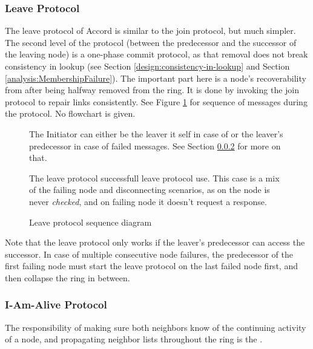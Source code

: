 \subsubsection{Leave Protocol}

The leave protocol of Accord is similar to the join protocol, but much simpler. The
 second level of the protocol (between the predecessor and the successor of the
 leaving node) is a one-phase commit protocol, as that removal does not break consistency in
 lookup (see Section \ref{design:consistency-in-lookup} and Section \ref{analysis:MembershipFailure}).
 The important part here is a node's
 recoverability from after being halfway removed from the ring. It is done by invoking
 the join protocol to repair links consistently. See Figure \ref{fig:leave-sequence} for
 sequence of messages during the protocol. No flowchart is given.

\begin{figure}[htp]
\centering
{}
\parbox{.9\linewidth}{
\begin{itemize}{\footnotesize
\item The Initiator can either be the leaver it self in case of  or
 the leaver's predecessor in case of failed  messages. See Section
 \ref{design:iamalive} for more on that.}
\end{itemize}
{\small
The leave protocol successfull leave protocol use. This case is a mix of the failing
 node and disconnecting scenarios, as on  the node is never
 \emph{checked}, and on failing node it doesn't request a response. }}
\caption{Leave protocol sequence diagram}
\label{fig:leave-sequence}
\end{figure}

Note that the leave protocol only works if the leaver's predecessor can access the
 successor. In case of multiple consecutive node failures, the predecessor of the
 first failing node must start the leave protocol on the last failed node first, and
 then collapse the ring in between.

\subsubsection{I-Am-Alive Protocol}
\label{design:iamalive}

The responsibility of making sure both neighbors know of the continuing activity of
 a node, and propagating neighbor lists throughout the ring is the .

